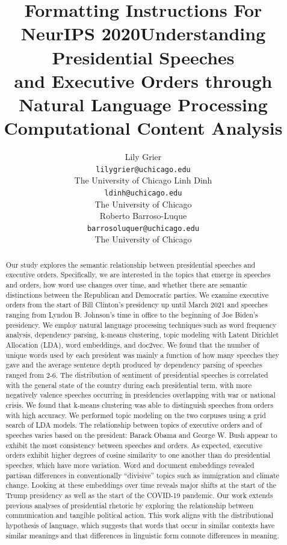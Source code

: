 \documentclass{article}
\title{Formatting Instructions For NeurIPS 2020}
\title{Understanding Presidential Speeches\\ and Executive Orders through Natural Language Processing\\
	\large Computational Content Analysis}
\author{Lily Grier \\
	\texttt{lilygrier@uchicago.edu}  \\
	The University of Chicago
	\AND
	Linh Dinh\\
	\texttt{ldinh@uchicago.edu} \\
    The University of Chicago\\
	\AND
	Roberto Barroso-Luque\\
	\texttt{barrosoluquer@uchicago.edu} \\
	The University of Chicago\\}
\begin{document}
\maketitle

\begin{abstract}{
		Our study explores the semantic relationship between presidential speeches and executive orders. Specifically, we are interested in the topics that emerge in speeches and orders, how word use changes over time, and whether there are semantic distinctions between the Republican and Democratic parties. We examine executive orders from the start of Bill Clinton’s presidency up until March 2021 and speeches ranging from Lyndon B. Johnson’s time in office to the beginning of Joe Biden’s presidency. We employ natural language processing techniques such as word frequency analysis, dependency parsing, k-means clustering, topic modeling with Latent Dirichlet Allocation (LDA), word embeddings, and doc2vec. We found that the number of unique words used by each president was mainly a function of how many speeches they gave and the average sentence depth produced by dependency parsing of speeches ranged from 2-6. The distribution of sentiment of presidential speeches is correlated with the general state of the country during each presidential term, with more negatively valence speeches occurring in presidencies overlapping with war or national crisis. We found that k-means clustering was able to distinguish speeches from orders with high accuracy. We performed topic modeling on the two corpuses using a grid search of LDA models. The relationship between topics of executive orders and of speeches varies based on the president: Barack Obama and George W. Bush appear to exhibit the most consistency between speeches and orders. As expected, executive orders exhibit higher degrees of cosine similarity to one another than do presidential speeches, which have more variation. Word and document embeddings revealed partisan differences in conventionally “divisive” topics such as immigration and climate change. Looking at these embeddings over time reveals major shifts at the start of the Trump presidency as well as the start of the COVID-19 pandemic. Our work extends previous analyses of presidential rhetoric by exploring the relationship between communication and tangible political action. This work aligns with the distributional hypothesis of language, which suggests that words that occur in similar contexts have similar meanings and that differences in linguistic form connote differences in meaning. 
	}
\end{abstract}
\end{document}
